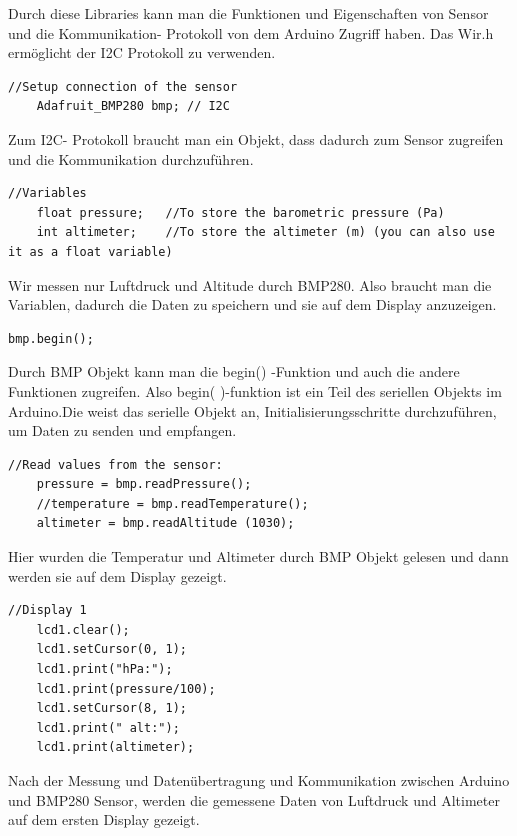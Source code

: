 \documentclass[conference]{IEEEtran}
\begin{document}
Durch diese Libraries kann man die Funktionen und Eigenschaften von Sensor und die Kommunikation- Protokoll von dem Arduino Zugriff haben. Das Wir.h ermöglicht der I2C Protokoll zu verwenden.  

\begin{lstlisting}[style=CStyle]
	//Setup connection of the sensor
	Adafruit_BMP280 bmp; // I2C
\end{lstlisting}

Zum I2C- Protokoll braucht man ein Objekt, dass dadurch zum Sensor zugreifen und die Kommunikation durchzuführen. 

\begin{lstlisting}[style=CStyle]
	//Variables
	float pressure;   //To store the barometric pressure (Pa)
	int altimeter;    //To store the altimeter (m) (you can also use it as a float variable)
\end{lstlisting}

Wir messen nur Luftdruck und Altitude durch BMP280. Also braucht man die Variablen, dadurch die Daten zu speichern und sie auf dem Display anzuzeigen. 

\begin{lstlisting}[style=CStyle]
	bmp.begin();
\end{lstlisting}

Durch BMP Objekt kann man die begin() -Funktion und auch die andere Funktionen zugreifen. Also begin( )-funktion ist ein Teil des seriellen Objekts im Arduino.Die  weist das serielle Objekt an, Initialisierungsschritte durchzuführen, um Daten zu senden und empfangen.

\begin{lstlisting}[style=CStyle]
	//Read values from the sensor:
	pressure = bmp.readPressure();
	//temperature = bmp.readTemperature();
	altimeter = bmp.readAltitude (1030);
\end{lstlisting}

Hier wurden die Temperatur und Altimeter durch BMP Objekt gelesen und dann werden sie auf dem Display gezeigt. 

\begin{lstlisting}[style=CStyle]
	//Display 1
	lcd1.clear();
	lcd1.setCursor(0, 1);
	lcd1.print("hPa:");
	lcd1.print(pressure/100); 
	lcd1.setCursor(8, 1);
	lcd1.print(" alt:");
	lcd1.print(altimeter);
\end{lstlisting}

Nach der Messung und Datenübertragung und Kommunikation zwischen Arduino und BMP280 Sensor, werden die gemessene Daten von Luftdruck und Altimeter auf dem ersten Display gezeigt. 
\end{document}
